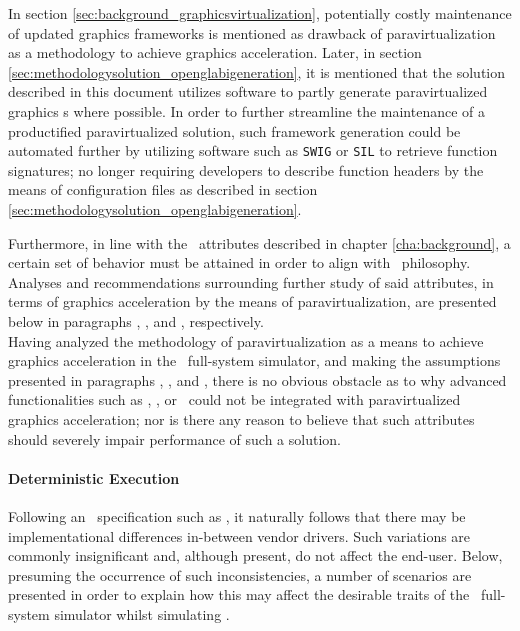 In section \ref{sec:background_graphicsvirtualization}, potentially costly maintenance of updated graphics frameworks is mentioned as drawback of paravirtualization as a methodology to achieve graphics acceleration.
Later, in section \ref{sec:methodologysolution_openglabigeneration}, it is mentioned that the solution described in this document utilizes software to partly generate paravirtualized graphics \dvttermabi s where possible.
In order to further streamline the maintenance of a productified paravirtualized solution, such framework generation could be automated further by utilizing software such as \texttt{SWIG} or \texttt{SIL} to retrieve function signatures; no longer requiring developers to describe function headers by the means of configuration files as described in section \ref{sec:methodologysolution_openglabigeneration}.

Furthermore, in line with the \dvttermsimics\ attributes described in chapter \ref{cha:background}, a certain set of behavior must be attained in order to align with \dvttermsimics\ philosophy.
Analyses and recommendations surrounding further study of said attributes, in terms of graphics acceleration by the means of paravirtualization, are presented below in paragraphs , , and , respectively.\\

\noindent
Having analyzed the methodology of paravirtualization as a means to achieve graphics acceleration in the \dvttermsimics\ full-system simulator, and making the assumptions presented in paragraphs , , and , there is no obvious obstacle as to why advanced functionalities such as \dvttermdeterministicexecution , \dvttermcheckpointing , or \dvttermreverseexecution\ could not be integrated with paravirtualized graphics acceleration; nor is there any reason to believe that such attributes should severely impair performance of such a solution.

\paragraph{Deterministic Execution}
\label{par:appendixa_simicsproductification_deterministicexecution}
Following an \dvttermapi\ specification such as \dvttermopengles , it naturally follows that there may be implementational differences in-between vendor drivers.
Such variations are commonly insignificant and, although present, do not affect the end-user.
Below, presuming the occurrence of such inconsistencies, a number of scenarios are presented in order to explain how this may affect the desirable traits of the \dvttermsimics\ full-system simulator whilst simulating \dvttermopengles .

